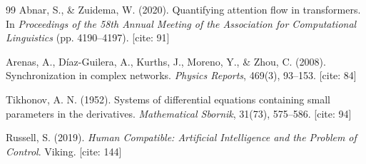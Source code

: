 \documentclass[12pt,a4paper]{article}
\theoremstyle{plain}
\theoremstyle{definition}
\begin{document}
\begin{thebibliography}{99}
Abnar, S., \& Zuidema, W. (2020). Quantifying attention flow in transformers. In \textit{Proceedings of the 58th Annual Meeting of the Association for Computational Linguistics} (pp. 4190--4197). [cite: 91]

Arenas, A., D\'{i}az-Guilera, A., Kurths, J., Moreno, Y., \& Zhou, C. (2008). Synchronization in complex networks. \textit{Physics Reports}, 469(3), 93--153. [cite: 84]

Tikhonov, A. N. (1952). Systems of differential equations containing small parameters in the derivatives. \textit{Mathematical Sbornik}, 31(73), 575--586. [cite: 94]

Russell, S. (2019). \textit{Human Compatible: Artificial Intelligence and the Problem of Control}. Viking. [cite: 144]
\end{thebibliography}
\end{document}
